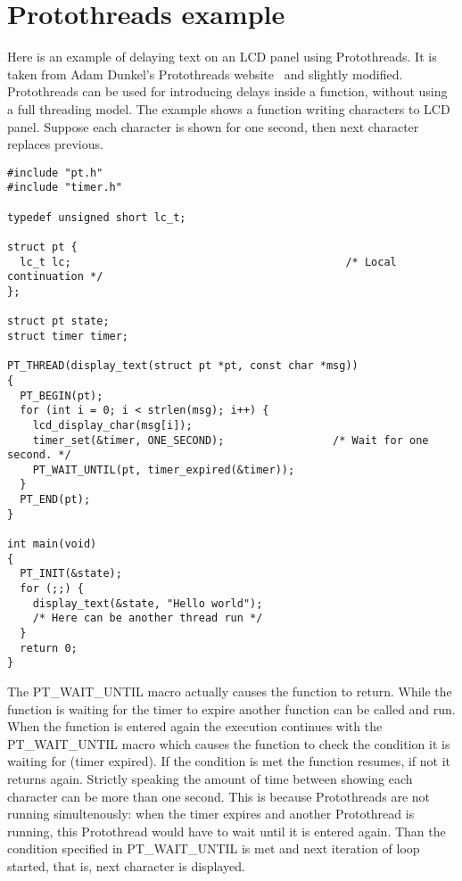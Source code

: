 

\chapter{Protothreads example}\label{app:protothreads}
Here is
an example of delaying text on an LCD panel using Protothreads.
It is taken from
Adam Dunkel's Protothreads website~\cite{adam-protothreads} and slightly modified.
Protothreads can be used for introducing delays inside a function, without using a full threading model.
The example shows a function writing characters to LCD panel.
Suppose each character is shown for one second, then next character replaces previous.
\begin{lstlisting}
#include "pt.h"
#include "timer.h"

typedef unsigned short lc_t;

struct pt {
  lc_t lc;                                           /* Local continuation */
}; 

struct pt state;
struct timer timer;
 
PT_THREAD(display_text(struct pt *pt, const char *msg))
{
  PT_BEGIN(pt);
  for (int i = 0; i < strlen(msg); i++) {
    lcd_display_char(msg[i]);
    timer_set(&timer, ONE_SECOND);                 /* Wait for one second. */
    PT_WAIT_UNTIL(pt, timer_expired(&timer));
  }
  PT_END(pt);
}

int main(void)
{
  PT_INIT(&state);
  for (;;) {
    display_text(&state, "Hello world");
    /* Here can be another thread run */
  }
  return 0;
}
\end{lstlisting}
The PT\_WAIT\_UNTIL macro actually causes the function to return.
While the function is waiting for the timer to expire another function can be called and run.
When the function is entered again the execution continues with the PT\_WAIT\_UNTIL macro
which causes the function to check the condition it is waiting for (timer expired).
If the condition is met the function resumes, if not it returns again.
Strictly speaking the amount of time between showing each character can
be more than one second.
This is because Protothreads are not running simultenously: when the timer expires
and another Protothread is running, this Protothread would have to wait until
it is entered again. Than the condition specified in PT\_WAIT\_UNTIL is met and
next iteration of loop started, that is, next character is displayed.

